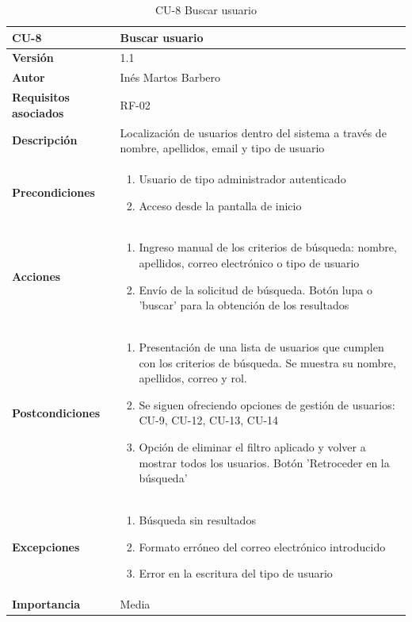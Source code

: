 \begin{table}[p]
	\centering
	\begin{tabularx}{\linewidth}{ p{} p{} }
		\toprule
		\textbf{CU-8}    & \textbf{Buscar usuario}\\
		\toprule
		\textbf{Versión}              & 1.1    \\
		\textbf{Autor}                & Inés Martos Barbero \\
		\textbf{Requisitos asociados} & RF-02 \\
		\textbf{Descripción}          & Localización de usuarios dentro del sistema a través de nombre, apellidos, email y tipo de usuario \\
		\textbf{Precondiciones}         & 
            \begin{enumerate}
			\def\labelenumi{\arabic{enumi}.}
			\tightlist
			\item Usuario de tipo administrador autenticado
			\item Acceso desde la pantalla de inicio
		\end{enumerate}\\
		\textbf{Acciones}             &
		\begin{enumerate}
			\def\labelenumi{\arabic{enumi}.}
			\tightlist
			\item Ingreso manual de los criterios de búsqueda: nombre, apellidos, correo electrónico o tipo de usuario
			\item Envío de la solicitud de búsqueda. Botón lupa o 'buscar' para la obtención de los resultados
		\end{enumerate}\\
		\textbf{Postcondiciones}        & 
            \begin{enumerate}
			\def\labelenumi{\arabic{enumi}.}
			\tightlist
			\item Presentación de una lista de usuarios que cumplen con los criterios de búsqueda. Se muestra su nombre, apellidos, correo y rol.
			\item Se siguen ofreciendo opciones de gestión de usuarios: CU-9, CU-12, CU-13, CU-14
            \item Opción de eliminar el filtro aplicado y volver a mostrar todos los usuarios. Botón 'Retroceder en la búsqueda'
		\end{enumerate}\\
		\textbf{Excepciones}          & 
            \begin{enumerate}
			\def\labelenumi{\arabic{enumi}.}
			\tightlist
			\item Búsqueda sin resultados
			\item Formato erróneo del correo electrónico introducido
            \item Error en la escritura del tipo de usuario
		\end{enumerate}\\
		\textbf{Importancia}          & Media \\
		\bottomrule
	\end{tabularx}
	\caption{CU-8 Buscar usuario}
    \label{CU-8}
\end{table}


